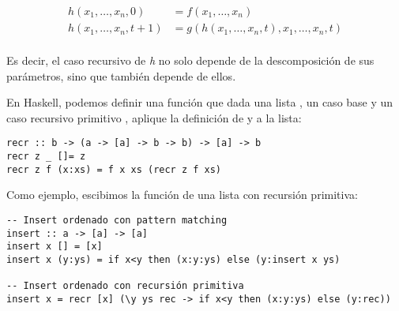 \begin{align*}
	h(x_1,\dots,x_n,0) &= f(x_1,\dots,x_n) \\
	h(x_1,\dots,x_n,t+1) &= g(h(x_1,\dots,x_n, t),x_1,\dots, x_n, t) \\
\end{align*}

Es decir, el caso recursivo de \textit{h} no solo depende de la descomposición de sus parámetros, sino que también depende de ellos.

En Haskell, podemos definir una función que dada una lista , un caso base  y un caso recursivo primitivo , aplique la definición de  y  a la lista:

\begin{centrado}
	\begin{verbatim}
recr :: b -> (a -> [a] -> b -> b) -> [a] -> b
recr z _ []= z
recr z f (x:xs) = f x xs (recr z f xs)
	\end{verbatim}
\end{centrado}
\vspace*{2mm}

Como ejemplo, escibimos la función  de una lista con recursión primitiva:

\begin{centrado}
	\begin{verbatim}
-- Insert ordenado con pattern matching
insert :: a -> [a] -> [a]
insert x [] = [x]
insert x (y:ys) = if x<y then (x:y:ys) else (y:insert x ys)
		
-- Insert ordenado con recursión primitiva
insert x = recr [x] (\y ys rec -> if x<y then (x:y:ys) else (y:rec))
	\end{verbatim}
\end{centrado}

